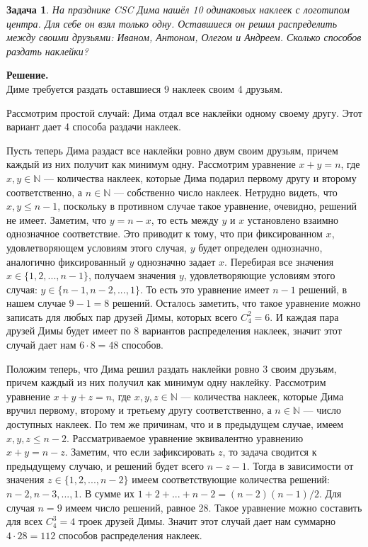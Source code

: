 \documentclass[12pt]{article}
\newtheorem{problem}{Задача}
\newcommand\TheSolution{%
  \textbf{Решение.}\\%
}
\begin{document}
    \begin{problem}
        На празднике CSC Дима нашёл 10 одинаковых наклеек с логотипом центра. Для себе он взял только одну. Оставшиеся он решил распределить между своими друзьями: Иваном, Антоном, Олегом и Андреем. Сколько способов раздать наклейки?
    \end{problem}
    \TheSolution
    Диме требуется раздать оставшиеся 9 наклеек своим 4 друзьям.

    Рассмотрим простой случай: Дима отдал все наклейки одному своему другу. Этот вариант дает 4 способа раздачи наклеек.
    
    Пусть теперь Дима раздаст все наклейки ровно двум своим друзьям, причем каждый из них получит как минимум одну.
    Рассмотрим уравнение $x + y = n$, где $x, y \in \mathbb{N}$ — количества наклеек, которые Дима подарил первому другу и второму соответственно, а $n \in \mathbb{N}$ — собственно число наклеек.
    Нетрудно видеть, что $x, y \leqslant n - 1$, поскольку в противном случае такое уравнение, очевидно, решений не имеет.
    Заметим, что $y = n - x$, то есть между $y$ и $x$ установлено взаимно однозначное соответствие. Это приводит к тому, что при фиксированном $x$, удовлетворяющем условиям этого случая, $y$ будет определен однозначно, аналогично фиксированный $y$ однозначно задает $x$. Перебирая все значения $x \in \{1, 2, ..., n - 1\}$, получаем значения $y$, удовлетворяющие условиям этого случая: $y \in \{n - 1, n - 2, ..., 1\}$.
    То есть это уравнение имеет $n - 1$ решений, в нашем случае $9 - 1 = 8$ решений. Осталось заметить, что такое уравнение можно записать для любых пар друзей Димы, которых всего $C_4^2 = 6$. И каждая пара друзей Димы будет имеет по 8 вариантов распределения наклеек, значит этот случай дает нам $6\cdot8 = 48$ способов.

    Положим теперь, что Дима решил раздать наклейки ровно 3 своим друзьям, причем каждый из них получил как минимум одну наклейку.
    Рассмотрим уравнение $x + y + z = n$, где $x, y, z \in \mathbb{N}$ — количества наклеек, которые Дима вручил первому, второму и третьему другу соответственно, а $n \in \mathbb{N}$ — число доступных наклеек.
    По тем же причинам, что и в предыдущем случае, имеем $x, y, z \leqslant n - 2$. Рассматриваемое уравнение эквивалентно уравнению $x + y = n - z$.
    Заметим, что если зафиксировать $z$, то задача сводится к предыдущему случаю, и решений будет всего $n - z - 1$.
    Тогда в зависимости от значения $z \in \{1, 2, ..., n - 2\}$ имеем соответствующие количества решений: $n - 2, n - 3, ..., 1$. В сумме их $1 + 2 + ... + n - 2 = (n-2)(n-1)/2$. Для случая $n = 9$ имеем число решений, равное 28. Такое уравнение можно составить для всех $C_4^3 = 4$ троек друзей Димы. Значит этот случай дает нам суммарно $4\cdot28 = 112$ способов распределения наклеек.
\end{document}

